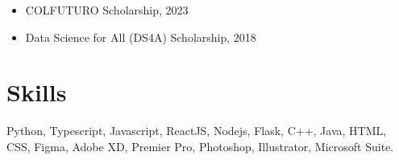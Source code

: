 \documentclass[11pt,a4paper]{article}
\begin{document}
\begin{itemize}[noitemsep]
    \item COLFUTURO Scholarship, 2023
    \item Data Science for All (DS4A) Scholarship, 2018
\end{itemize}

\section*{Skills}

Python, Typescript, Javascript, ReactJS, Nodejs, Flask, C++, Java, HTML, CSS, Figma, Adobe XD, Premier Pro, Photoshop, Illustrator, Microsoft Suite.
\end{document}
